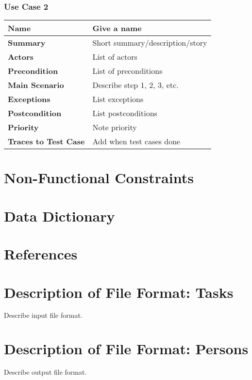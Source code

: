 \documentclass[12pt]{article}
\begin{document}
\subsubsection{Use Case 2} \label{uc:2}
\begin{tabular}{|p{}|p{}|}
\hline
\bf Name & Give a name \\ \hline
\bf Summary & Short summary/description/story \\ \hline
\bf Actors & List of actors \\ \hline
\bf Precondition & List of preconditions \\ \hline
\bf Main Scenario & Describe step 1, 2, 3, etc. \\ \hline
\bf Exceptions & List exceptions \\ \hline
\bf Postcondition & List postconditions \\ \hline
\bf Priority & Note priority \\ \hline
\bf Traces to Test Case & Add when test cases done \\ \hline
\end{tabular}

\section{Non-Functional Constraints}

\section{Data Dictionary}

\section{References}

\appendix

\section{Description of File Format: Tasks}

Describe input file format.

\section{Description of File Format: Persons}

Describe output file format.
\end{document}

